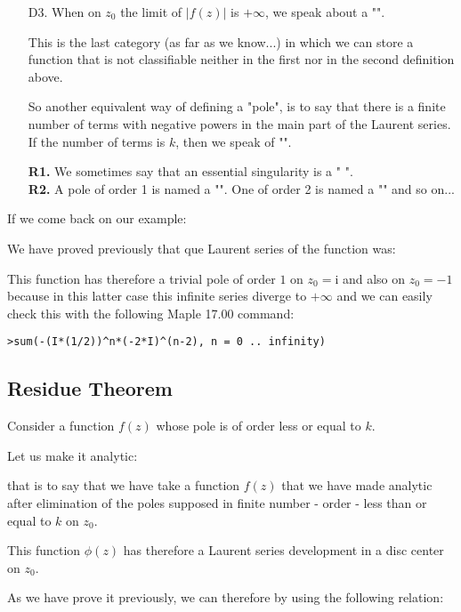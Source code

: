 \begin{enumerate}
		\item[D3.] When on $z_0$ the limit of $\vert f(z) \vert$ is $+\infty$, we speak about a "".
		
		This is the last category (as far as we know...) in which we can store a function that is not classifiable neither in the first nor in the second definition above.
		
		So another equivalent way of defining a "pole", is to say that there is a finite number of terms with negative powers in the main part of the Laurent series. If the number of terms is $k$, then we speak of "".
		
	\begin{tcolorbox}[title=Remarks,colframe=black,arc=10pt]
	\textbf{R1.} We sometimes say that an essential singularity is a " ".\\
	
	\textbf{R2.} A pole of order 1 is named a "". One of order 2 is named a "" and so on...
	\end{tcolorbox}
	\end{enumerate}
	If we come back on our example:
	
	We have proved previously that que Laurent series of the function was:
	
	This function has therefore a trivial pole of order $1$ on $z_0=\mathrm{i}$ and also on $z_0=-1$ because in this latter case this infinite series diverge to $+\infty$ and we can easily check this with the following Maple 17.00 command:
	
	\texttt{>sum(-(I*(1/2))\string^n*(-2*I)\string^(n-2), n = 0 .. infinity)}
	
	\subsection{Residue Theorem}\label{residue theorem}
	Consider a function $f(z)$ whose pole is of order less or equal to $k$.
	
	Let us make it  analytic:
	
	that is to say that we have take a function $f(z)$ that we have made analytic after elimination of the poles supposed in finite number - order - less than or equal to $k$ on $z_0$. 
	
	This function $\phi(z)$ has therefore a Laurent series development  in a disc center on $z_0$.
	
	As we have prove it previously, we can therefore by using the following relation:
	
